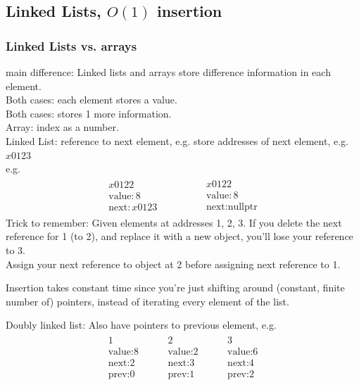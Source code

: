 \documentclass[10pt]{amsart}
\begin{document}
\subsection{Linked Lists, $O(1)$ insertion}

\subsubsection{Linked Lists vs. arrays}

main difference: Linked lists and arrays store difference information in each element. \\

Both cases: each element stores a value. \\
Both cases: stores 1 more information. \\

Array: index as a number. \\
Linked List: reference to next element, e.g. store addresses of next element, e.g. $x0123$ \\
e.g.
\[
\begin{gathered}
\begin{gathered}
x0122 \\
\text{value}: 8 \\
\text{next}: x0123
\end{gathered} \qquad \qquad \, 
\begin{gathered}
x0122 \\
\text{value}: 8 \\
\text{next}: \text{nullptr}
\end{gathered}
\end{gathered}
\]
Trick to remember: Given elements at addresses 1, 2, 3. If you delete the next reference for 1 (to 2), and replace it with a new object, you'll lose your reference to 3. \\
Assign your next reference to object at 2 before assigning next reference to 1.

Insertion takes constant time since you're just shifting around (constant, finite number of) pointers, instead of iterating every element of the list.

Doubly linked list: Also have pointers to previous element, e.g.
\[
\begin{gathered}
\begin{gathered}
1 \\
\text{value:} 8 \\
\text{next:} 2 \\
\text{prev:} 0
\end{gathered} \qquad \, 
\begin{gathered}
2 \\
\text{value:} 2 \\
\text{next:} 3 \\
\text{prev:} 1
\end{gathered} \qquad \, 
\begin{gathered}
3 \\
\text{value:} 6 \\
\text{next:} 4 \\
\text{prev:} 2
\end{gathered}
\end{gathered}
\]
\end{document}
